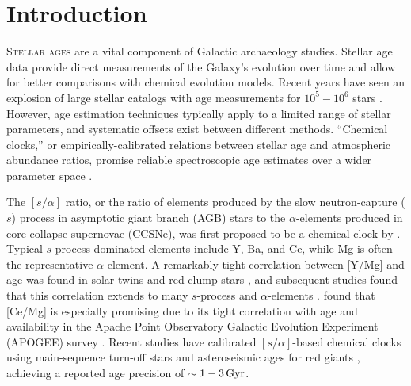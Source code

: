 \documentclass[twocolumn,twocolappendix]{aastex701}
\newcommand{\Gyr}{\,{\rm Gyr}}
\begin{document}
\section{Introduction}
\label{sec:introduction}

\lettrine{S}{tellar ages} are a vital component of Galactic archaeology studies. Stellar age data provide direct measurements of the Galaxy's evolution over time and allow for better comparisons with chemical evolution models. Recent years have seen an explosion of large stellar catalogs with age measurements for $10^5-10^6$ stars \citep[e.g.,][]{queiroz_starhorse_2020,xiang_time_2022,nataf_accurate_2024,stone-martinez_starflow_2025,wang_spectroscopic_2025,roberts_cn_2026}. However, age estimation techniques typically apply to a limited range of stellar parameters, and systematic offsets exist between different methods. ``Chemical clocks,'' or empirically-calibrated relations between stellar age and atmospheric abundance ratios, promise reliable spectroscopic age estimates over a wider parameter space \citep[e.g.,][]{hayden_galah_2022}. 

The $[s/\alpha]$ ratio, or the ratio of elements produced by the slow neutron-capture ($s$) process in asymptotic giant branch (AGB) stars to the $\alpha$-elements produced in core-collapse supernovae (CCSNe), was first proposed to be a chemical clock by \citet{nissen_high-precision_2015}. Typical $s$-process-dominated elements include Y, Ba, and Ce, while Mg is often the representative $\alpha$-element. A remarkably tight correlation between [Y/Mg] and age was found in solar twins \citep{nissen_high-precision_2015,tucci_maia_solar_2016,spina_temporal_2018} and red clump stars \citep{slumstrup_ymg_2017}, and subsequent studies found that this correlation extends to many $s$-process and $\alpha$-elements \citep{nissen_high-precision_2016,jofre_traits_2020,casali_tracing_2025}. \citet{casali_tracing_2025} found that [Ce/Mg] is especially promising due to its tight correlation with age and availability in the Apache Point Observatory Galactic Evolution Experiment (APOGEE) survey \citep{majewski_apogee_2017}. Recent studies have calibrated $[s/\alpha]$-based chemical clocks using main-sequence turn-off stars \citep{hayden_galah_2022} and asteroseismic ages for red giants \citep[e.g.,][]{casali_tracing_2025,pakstiene_calibration_2026,mikolaitis_non-lte_2026}, achieving a reported age precision of $\sim1-3\Gyr$. 
\end{document}
